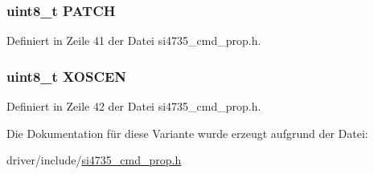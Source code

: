 \hypertarget{unionpower__up__arg1_aa2fc9067222815bec88b0dc6048b2956}{}
\subsubsection[{P\+A\+T\+C\+H}]{\setlength{\rightskip}{0pt plus 5cm}uint8\+\_\+t P\+A\+T\+C\+H}\label{unionpower__up__arg1_aa2fc9067222815bec88b0dc6048b2956}


Definiert in Zeile 41 der Datei si4735\+\_\+cmd\+\_\+prop.\+h.

\hypertarget{unionpower__up__arg1_a56b7fb7e7e5dfc8eed9d066f71579077}{}
\subsubsection[{X\+O\+S\+C\+E\+N}]{\setlength{\rightskip}{0pt plus 5cm}uint8\+\_\+t X\+O\+S\+C\+E\+N}\label{unionpower__up__arg1_a56b7fb7e7e5dfc8eed9d066f71579077}


Definiert in Zeile 42 der Datei si4735\+\_\+cmd\+\_\+prop.\+h.



Die Dokumentation für diese Variante wurde erzeugt aufgrund der Datei\+:\begin{DoxyCompactItemize}
\item 
driver/include/\hyperlink{si4735__cmd__prop_8h}{si4735\+\_\+cmd\+\_\+prop.\+h}\end{DoxyCompactItemize}
